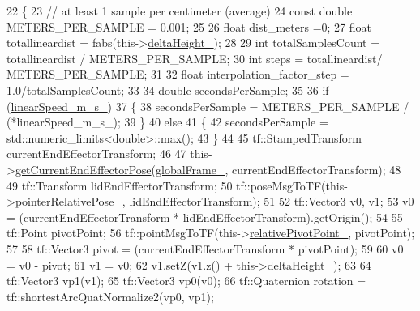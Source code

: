 \begin{DoxyCode}
22     \{
23         \textcolor{comment}{// at least 1 sample per centimeter (average)        }
24         \textcolor{keyword}{const} \textcolor{keywordtype}{double} METERS\_PER\_SAMPLE = 0.001;
25 
26         \textcolor{keywordtype}{float} dist\_meters =0;
27         \textcolor{keywordtype}{float} totallineardist = fabs(this->\hyperlink{classcl__move__group__interface_1_1CbCircularPouringMotion_a7009d617bcd8ac1fba49100444434f3c}{deltaHeight\_});
28 
29         \textcolor{keywordtype}{int} totalSamplesCount = totallineardist / METERS\_PER\_SAMPLE;
30         \textcolor{keywordtype}{int} steps = totallineardist/ METERS\_PER\_SAMPLE;
31 
32         \textcolor{keywordtype}{float} interpolation\_factor\_step = 1.0/totalSamplesCount;
33 
34         \textcolor{keywordtype}{double} secondsPerSample;
35 
36         \textcolor{keywordflow}{if} (\hyperlink{classcl__move__group__interface_1_1CbCircularPouringMotion_ac78ce543451cbb78c95862dd4273deb7}{linearSpeed\_m\_s\_})
37         \{
38             secondsPerSample = METERS\_PER\_SAMPLE / (*linearSpeed\_m\_s\_);
39         \}
40         \textcolor{keywordflow}{else}
41         \{
42             secondsPerSample = std::numeric\_limits<double>::max();
43         \}
44 
45         tf::StampedTransform currentEndEffectorTransform;
46 
47         this->\hyperlink{classcl__move__group__interface_1_1CbMoveEndEffectorTrajectory_a56945ccfff51e3eb9ec9c2edcfa132af}{getCurrentEndEffectorPose}(\hyperlink{classcl__move__group__interface_1_1CbCircularPouringMotion_a1d54253dc370bce8dd413e08b4bf8c43}{globalFrame\_}, 
      currentEndEffectorTransform);
48 
49         tf::Transform lidEndEffectorTransform;
50         tf::poseMsgToTF(this->\hyperlink{classcl__move__group__interface_1_1CbCircularPouringMotion_a5ebef44cab4cb3dec5148232ef0eb2f8}{pointerRelativePose\_}, lidEndEffectorTransform);
51 
52         tf::Vector3 v0, v1;
53         v0 = (currentEndEffectorTransform * lidEndEffectorTransform).getOrigin();
54 
55         tf::Point pivotPoint;
56         tf::pointMsgToTF(this->\hyperlink{classcl__move__group__interface_1_1CbCircularPouringMotion_a686d15e252dc8e503985e97014690cc6}{relativePivotPoint\_}, pivotPoint);
57 
58         tf::Vector3 pivot = (currentEndEffectorTransform * pivotPoint);
59         
60         v0 = v0 - pivot;
61         v1 = v0;
62         v1.setZ(v1.z() + this->\hyperlink{classcl__move__group__interface_1_1CbCircularPouringMotion_a7009d617bcd8ac1fba49100444434f3c}{deltaHeight\_});
63 
64         tf::Vector3 vp1(v1);
65         tf::Vector3 vp0(v0);
66         tf::Quaternion rotation = tf::shortestArcQuatNormalize2(vp0, vp1);

\end{DoxyCode}
